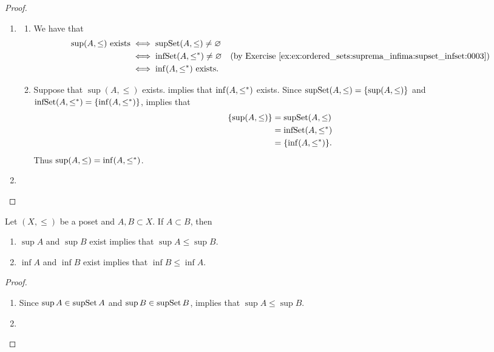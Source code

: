 \documentclass{book}
\begin{document}
	\begin{proof}\
		\begin{enumerate}
			\item 
			\begin{enumerate}
				\item We have that
				\begin{align*}
					\text{$\sup(A, \leq)$ exists}
					& \iff \supSet(A, \leq) \neq \varnothing \\
					& \iff \infSet(A, \lop) \neq \varnothing \quad \text{(by \rex{ex:ordered_sets:suprema_infima:supset_infset:0003})} \\
					& \iff \text{$\inf (A, \lop)$ exists}.
				\end{align*}
				\item Suppose that $\sup(A, \leq)$ exists.  implies that $\inf (A, \leq^*)$ exists. Since $\operatorname{supSet}(A, \leq) = \{\sup (A, \leq) \}$ and $\operatorname{infSet}(A, \leq^*) = \{\inf (A, \leq^*) \}$,  implies that 
				\begin{align*}
					\{\sup (A, \leq) \}
					& = \operatorname{supSet}(A, \leq) \\
					& = \operatorname{infSet}(A, \leq^*) \\
					& = \{\inf (A, \leq^*) \}.
				\end{align*}
				Thus $\sup (A, \leq) = \inf (A, \leq^*)$.
			\end{enumerate}
			\item {}
		\end{enumerate}
	\end{proof}
	
	\begin{ex} 
		Let $(X, \leq)$ be a poset and $A, B \subset X$. If $A \subset B$, then
		\begin{enumerate}
			\item $\sup A$ and $\sup B$ exist implies that $\sup A \leq \sup B$.
			\item $\inf A$ and $\inf B$ exist implies that $\inf B \leq \inf A$.
		\end{enumerate}
	\end{ex}
	
	\begin{proof}
		\begin{enumerate}
			\item Since $\sup A \in \operatorname{supSet} A$ and $\sup B \in \operatorname{supSet} B$,  implies that $\sup A \leq \sup B$. 
			\item \tcr{FINISH!!!}
		\end{enumerate}
	\end{proof}
	
\end{document}
